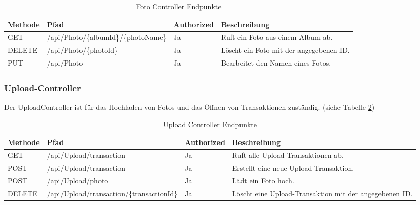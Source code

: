 \begin{table}[h t]
    \centering
    \caption{Foto Controller Endpunkte}
    \label{tab:foto-controller}
    \begin{tabular}{|l|p{5cm}|l|p{5cm}|}
    \hline
    \textbf{Methode} & \textbf{Pfad} & \textbf{Authorized} & \textbf{Beschreibung} \\ \hline
    GET & /api/Photo/\{albumId\}\break/\{photoName\} & Ja & Ruft ein Foto aus einem Album ab. \\ \hline
    DELETE & /api/Photo/\{photoId\} & Ja & Löscht ein Foto mit der angegebenen ID. \\ \hline
    PUT & /api/Photo & Ja & Bearbeitet den Namen eines Fotos. \\ \hline
    \end{tabular}
\end{table}


\subsubsection{Upload-Controller}

Der UploadController ist für das Hochladen von Fotos und das Öffnen von 
Transaktionen zuständig. (siehe Tabelle \ref{tab:upload-controller})

\begin{table}[h t]
    \centering
    \caption{Upload Controller Endpunkte}
    \label{tab:upload-controller}
    \begin{tabular}{|l|p{5cm}|l|p{5cm}|}
    \hline
    \textbf{Methode} & \textbf{Pfad} & \textbf{Authorized} & \textbf{Beschreibung} \\ \hline
    GET & /api/Upload/transaction & Ja & Ruft alle Upload-Transaktionen ab. \\ \hline
    POST & /api/Upload/transaction & Ja & Erstellt eine neue Upload-Transaktion. \\ \hline
    POST & /api/Upload/photo & Ja & Lädt ein Foto hoch. \\ \hline
    DELETE & /api/Upload/transaction\break/\{transactionId\} & Ja & Löscht eine Upload-Transaktion mit der angegebenen ID. \\ \hline
    \end{tabular}
\end{table}


